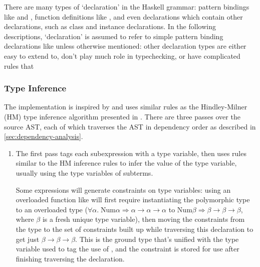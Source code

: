 \documentclass[dissertation.tex]{subfiles}
\begin{document}
{{        

        There are many types of `declaration' in the Haskell grammar: pattern bindings like  and
        , function definitions like , and even declarations
        which contain other declarations, such as class and instance declarations. In the following descriptions,
        `declaration' is assumed to refer to simple pattern binding declarations like  unless otherwise
        mentioned: other declaration types are either easy to extend to, don't play much role in typechecking, or have
        complicated rules that 


        \subsubsection{Type Inference}
        {

            The implementation is inspired by \cite{THIH} and uses similar rules as the Hindley-Milner (HM) type
            inference algorithm presented in \cite{HM-rules}. There are three passes over the source AST, each of which
            traverses the AST in dependency order as described in \ref{sec:dependency-analysis}.

            \begin{enumerate}
            \item
            {
                
                The first pass tags each subexpression with a type variable, then uses rules similar to the HM inference
                rules to infer the value of the type variable, usually using the type variables of subterms.
                
                Some expressions will generate constraints on type variables: using an overloaded function like
                \haskell{(+)} will first require instantiating the polymorphic type to an overloaded type
                (\(\forall\alpha.\;\text{Num}\alpha\Rightarrow\alpha\rightarrow\alpha\rightarrow\alpha\) to
                \(\text{Num}\beta\Rightarrow\beta\rightarrow\beta\rightarrow\beta\), where \(\beta\) is a fresh unique
                type variable), then moving the constraints from the type to the set of constraints built up while
                traversing this declaration to get just \(\beta\rightarrow\beta\rightarrow\beta\). This is the ground
                type that's unified with the type variable used to tag the use of \haskell{(+)}, and the constraint is
                stored for use after finishing traversing the declaration.

}
\end{enumerate}}}}
\end{document}
